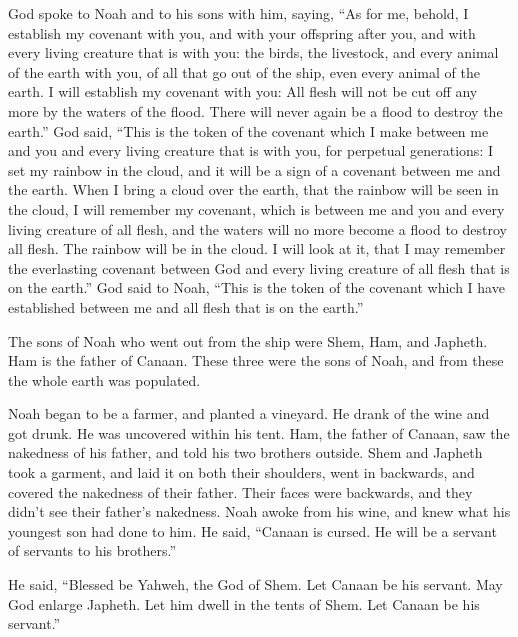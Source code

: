  God spoke to Noah and to his sons with him, saying,
 ``As for me, behold, I establish my covenant with you,
and with your offspring after you,  and with every living
creature that is with you: the birds, the livestock, and every animal of
the earth with you, of all that go out of the ship, even every animal of
the earth.  I will establish my covenant with you: All
flesh will not be cut off any more by the waters of the flood. There
will never again be a flood to destroy the earth.''  God
said, ``This is the token of the covenant which I make between me and
you and every living creature that is with you, for perpetual
generations:  I set my rainbow in the cloud, and it will
be a sign of a covenant between me and the earth.  When I
bring a cloud over the earth, that the rainbow will be seen in the
cloud,  I will remember my covenant, which is between me
and you and every living creature of all flesh, and the waters will no
more become a flood to destroy all flesh.  The rainbow
will be in the cloud. I will look at it, that I may remember the
everlasting covenant between God and every living creature of all flesh
that is on the earth.''  God said to Noah, ``This is the
token of the covenant which I have established between me and all flesh
that is on the earth.''

 The sons of Noah who went out from the ship were Shem,
Ham, and Japheth. Ham is the father of Canaan.  These
three were the sons of Noah, and from these the whole earth was
populated.

 Noah began to be a farmer, and planted a vineyard.
 He drank of the wine and got drunk. He was uncovered
within his tent.  Ham, the father of Canaan, saw the
nakedness of his father, and told his two brothers outside.
 Shem and Japheth took a garment, and laid it on both
their shoulders, went in backwards, and covered the nakedness of their
father. Their faces were backwards, and they didn't see their father's
nakedness.  Noah awoke from his wine, and knew what his
youngest son had done to him.  He said, ``Canaan is
cursed. He will be a servant of servants to his brothers.''

 He said, ``Blessed be Yahweh, the God of Shem. Let
Canaan be his servant.  May God enlarge Japheth. Let him
dwell in the tents of Shem. Let Canaan be his servant.''

